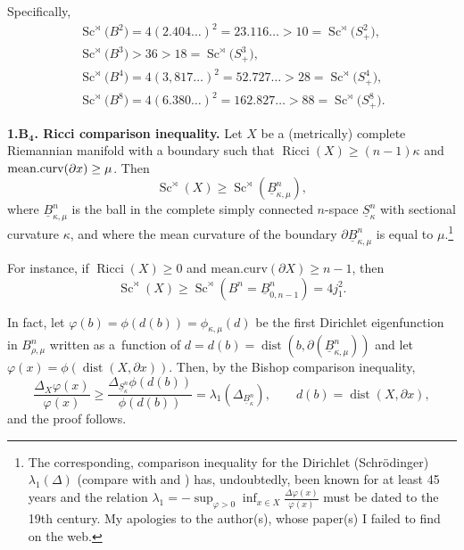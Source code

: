 \documentclass[pdftex]{sigma}
\numberwithin{equation}{section}
\begin{document}
Specifically,
\begin{gather*}\operatorname{Sc}^\rtimes \bigl(B^2\bigr)=4(2.404\dots)^2=23.116\ldots>10=\operatorname{Sc}^\rtimes \bigl(S^2_+\bigr),\\
\operatorname{Sc}^\rtimes \bigl(B^3\bigr)>36>18=\operatorname{Sc}^\rtimes \bigl(S^3_+\bigr),\\
\operatorname{Sc}^\rtimes \bigl(B^4\bigr)=4(3,817\dots)^2=52.727\ldots>28=\operatorname{Sc}^\rtimes \bigl(S^4_+\bigr),\\
\operatorname{Sc}^\rtimes \bigl(B^8\bigr)=4(6.380\dots)^2= 162.827\ldots>88 =\operatorname{Sc}^\rtimes \bigl(S^8_+\bigr).
\end{gather*}


 \textbf{1.B$\boldsymbol{{}_4}$. Ricci comparison inequality.} Let $X$ be a (metrically) complete Riemannian mani\-fold with a boundary
 such that $\operatorname{Ricci}(X)\geq (n-1)\kappa$
 and ${\rm mean.curv}(\partial x)\geq \mu$.
Then
\[
\operatorname{Sc}^{\rtimes}(X)\geq \operatorname{Sc}^\rtimes(\underline B^n_{\kappa, \mu}),
\]
where $\underline B^n_{\kappa, \mu}$ is the ball in the complete simply connected $n$-space
$\underline S^n_\kappa$ with sectional curvature
$\kappa$, and where the mean curvature of the boundary $\partial \underline B^n_{\kappa, \mu}$ is equal to $\mu$.\footnote{The corresponding, comparison inequality for the Dirichlet (Schr\"odinger) $\lambda_1(\Delta)$ (compare with \cite{CF1974} and \cite{BF2017})
has, undoubtedly, been known for at least 45 years and the relation
$\lambda_1=-\sup_{\varphi>0}\inf_{x\in X} \frac {\Delta\varphi(x)}{\varphi(x)}$ must be dated to
the 19th century. My apologies to the author(s), whose paper(s) I failed to find on the web.}

For instance,  if $\operatorname{Ricci}(X)\geq 0$ and $\mathrm{mean.curv}(\partial X)\geq n-1$, then
\[
\operatorname{Sc}^{\rtimes}(X)\geq \operatorname{Sc}^\rtimes( B^n=\underline B^n_{0,n-1})=4j_1^2.
\]

In fact, let $\varphi(b) =\phi(d(b))=\phi_{\kappa, \mu}(d)$ be the first Dirichlet eigenfunction in $B^n_{\rho, \mu}$ written as
a~function of $d=d(b)=\operatorname{dist}(b, \partial (\underline B^n_{\kappa, \mu}))$ and let
$\varphi(x)=\phi(\operatorname{dist}(X, \partial x))$. Then, by the Bishop comparison inequality,
\[
\frac {\Delta_X\varphi(x)}{\varphi(x)}
\geq \frac {\Delta_{\underline S^n_\kappa}\phi(d(b))}{\phi(d(b))}=\lambda_1(\Delta_{\underline B^n_\kappa}),
\qquad
 d(b)=\operatorname{dist}(X,\partial x),
\]
and the proof follows.
\end{document}

